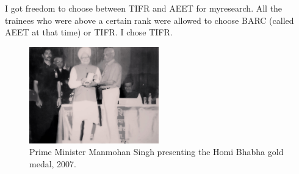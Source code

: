 I got freedom to choose between TIFR and AEET for my\break research. All the 
trainees who were above a certain rank were allowed to choose BARC 
(called AEET at that time) or TIFR. I chose TIFR.
\smallskip

\begin{figure}[H]
\centering
\includegraphics[width=0.5\textwidth]{images/Rajaji-04.jpg}
\caption{\small{Prime Minister Manmohan Singh presenting the Homi Bhabha
gold medal, 2007.}}
\end{figure}

